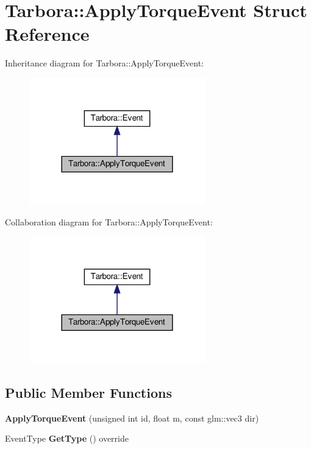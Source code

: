\hypertarget{structTarbora_1_1ApplyTorqueEvent}{}\section{Tarbora\+:\+:Apply\+Torque\+Event Struct Reference}
\label{structTarbora_1_1ApplyTorqueEvent}


Inheritance diagram for Tarbora\+:\+:Apply\+Torque\+Event\+:\nopagebreak
\begin{figure}[H]
\begin{center}
\leavevmode
\includegraphics[width=216pt]{structTarbora_1_1ApplyTorqueEvent__inherit__graph}
\end{center}
\end{figure}


Collaboration diagram for Tarbora\+:\+:Apply\+Torque\+Event\+:\nopagebreak
\begin{figure}[H]
\begin{center}
\leavevmode
\includegraphics[width=216pt]{structTarbora_1_1ApplyTorqueEvent__coll__graph}
\end{center}
\end{figure}
\subsection*{Public Member Functions}
\begin{DoxyCompactItemize}
\item 
\mbox{\label{structTarbora_1_1ApplyTorqueEvent_aa08f9eb9d3a1b1cec4dacff266bfd973}} 
{\bfseries Apply\+Torque\+Event} (unsigned int id, float m, const glm\+::vec3 dir)
\item 
\mbox{\label{structTarbora_1_1ApplyTorqueEvent_acf01b6fe964cf451512153d4836f1f0c}} 
Event\+Type {\bfseries Get\+Type} () override
\end{DoxyCompactItemize}
